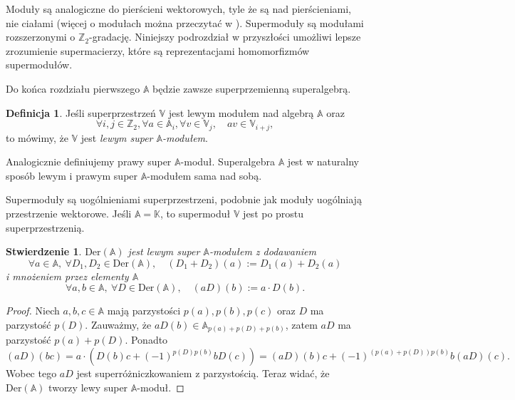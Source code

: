 \documentclass[11pt,a4paper]{report}
\newtheorem{proposition}[theorem]{Stwierdzenie}
\theoremstyle{definition}
\newtheorem{definition}[theorem]{Definicja}
\begin{document}
Moduły są analogiczne do pierścieni wektorowych, tyle że są nad pierścieniami, nie ciałami (więcej o modułach można przeczytać w \cite{lang}). Supermoduły są modułami rozszerzonymi o $\mathbb{Z}_2$-gradację. Niniejszy podrozdział w przyszłości umożliwi lepsze zrozumienie supermacierzy, które są reprezentacjami homomorfizmów supermodułów. 

Do końca rozdziału pierwszego $\mathbb{A}$ będzie zawsze superprzemienną superalgebrą. 

\begin{definition}
Jeśli superprzestrzeń $\mathbb{V}$ jest lewym modułem nad algebrą $\mathbb{A}$ oraz
\begin{equation}
\label{supermodule_definition}
\forall i,j \in \mathbb{Z}_2, \forall a \in \mathbb{A}_i, \forall v \in \mathbb{V}_j,\quad av \in \mathbb{V}_{i+j},
\end{equation}
to mówimy, że $\mathbb{V}$ jest \textit{lewym super $\mathbb{A}$-modułem}.
\label{supermodule}
\end{definition}

Analogicznie definiujemy  prawy super $\mathbb{A}$-moduł. Superalgebra $\mathbb{A}$ jest w naturalny sposób lewym i prawym super $\mathbb{A}$-modułem sama nad sobą. 

Supermoduły są uogólnieniami superprzestrzeni, podobnie jak moduły uogólniają przestrzenie wektorowe. Jeśli $\mathbb{A} = \mathbb{K}$, to supermoduł $\mathbb{V}$ jest po prostu superprzestrzenią.

\begin{proposition}
\label{superdifferential_module}
$\mathrm{Der}(\mathbb{A})$ jest lewym super $\mathbb{A}$-modułem z dodawaniem 
\begin{equation*}
 \forall a \in \mathbb{A},\ \forall D_1, D_2 \in \mathrm{Der}(\mathbb{A}), \quad (D_1 + D_2)(a) := D_1(a) + D_2(a)
\end{equation*}
i mnożeniem przez elementy $\mathbb{A}$
\begin{equation*}
 \forall a,b \in \mathbb{A},\ \forall D \in \mathrm{Der}(\mathbb{A}), \quad (aD)(b) := a \cdot D(b).
\end{equation*}
\end{proposition}

\begin{proof}
Niech $a,b,c \in \mathbb{A}$ mają parzystości $p(a), p(b), p(c)$ oraz $D$ ma parzystość $p(D)$. Zauważmy, że $aD(b) \in \mathbb{A}_{p(a) + p(D) + p(b)}$, zatem $aD$ ma parzystość $p(a)+p(D)$. Ponadto 
\begin{equation}
\label{eq:superdifferentiation_module_structure}
 (aD)(bc) = a \cdot (D(b) c + (-1)^{p(D)p(b)}bD(c)) = (aD)(b)c + (-1)^{(p(a)+p(D))p(b)}b(aD)(c).
\end{equation}
Wobec tego $aD$ jest superróżniczkowaniem z parzystością. Teraz widać, że $\mathrm{Der}(\mathbb{A})$ tworzy lewy super $\mathbb{A}$-moduł.
\end{proof}
\end{document}
